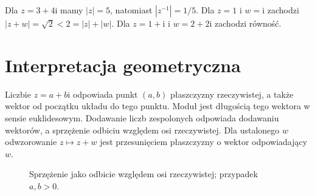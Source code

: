 \begin{przyklad}
Dla $z=3+4\mathrm i$ mamy $|z|=5$, natomiast $|z^{-1}|=1/5$. Dla $z=1$ i $w=\mathrm i$ zachodzi $|z+w|=\sqrt2<2=|z|+|w|$. Dla $z=1+\mathrm i$ i $w=2+2\mathrm i$ zachodzi równość.
\end{przyklad}

\section{Interpretacja geometryczna}
\label{ma1:sec:complex-geometry}
Liczbie $z=a+b\mathrm i$ odpowiada punkt $(a,b)$ płaszczyzny rzeczywistej, a także wektor od początku układu do tego punktu. Moduł jest długością tego wektora w sensie euklidesowym. Dodawanie liczb zespolonych odpowiada dodawaniu wektorów, a sprzężenie odbiciu względem osi rzeczywistej. Dla ustalonego $w$ odwzorowanie $z\mapsto z+w$ jest przesunięciem płaszczyzny o wektor odpowiadający $w$.

\begin{figure}[htbp]
\centering
{}
\caption{Sprzężenie jako odbicie względem osi rzeczywistej; przypadek $a,b>0$.}
\label{ma1:fig:complex-conjugation}
\end{figure}
\FloatBarrier


